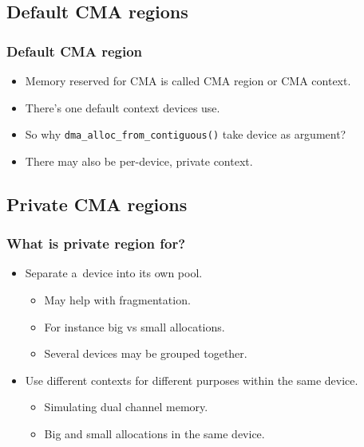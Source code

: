 
\subsection{Default CMA regions}

\begin{frame}
  \frametitle{Default CMA region}

  \begin{itemize}
  \item Memory reserved for CMA is called CMA region or CMA context.
  \item There's one default context devices use.
  \item So why \lstinline|dma_alloc_from_contiguous()| take device as
    argument?
  \item There may also be per-device, private context.
  \end{itemize}
\end{frame}

\subsection{Private CMA regions}

\begin{frame}
  \frametitle{What is private region for?}

  \begin{itemize}
  \item Separate a~device into its own pool.
    \begin{itemize}
    \item May help with fragmentation.
    \item For instance big vs small allocations.
    \item Several devices may be grouped together.
    \end{itemize}
  \item Use different contexts for different purposes within the same
    device.
    \begin{itemize}
    \item Simulating dual channel memory.
    \item Big and small allocations in the same device.
    \end{itemize}
  \end{itemize}
\end{frame}

